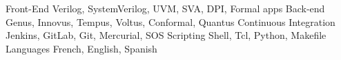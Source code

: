 

\begin{cvskills}

  \cvskill
    {Front-End} %
    {Verilog, SystemVerilog, UVM, SVA, DPI, Formal apps} %
  \cvskill
    {Back-end} %
    {Genus, Innovus, Tempus, Voltus, Conformal, Quantus} %
  \cvskill
    {Continuous Integration} %
    {Jenkins, GitLab, Git, Mercurial, SOS} %
  \cvskill
    {Scripting} %
    {Shell, Tcl, Python, Makefile} %
  \cvskill
    {Languages} %
    {French, English, Spanish} %

\end{cvskills}
